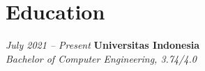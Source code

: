 \documentclass[../main.tex]{subfiles}
\begin{document}
\section{Education}

\begin{twocolentry}{
    \small
    \textit{July 2021 – Present}
}
    \textbf{Universitas Indonesia} \\
    \textit{Bachelor of Computer Engineering, 3.74/4.0}
\end{twocolentry}
\end{document}
